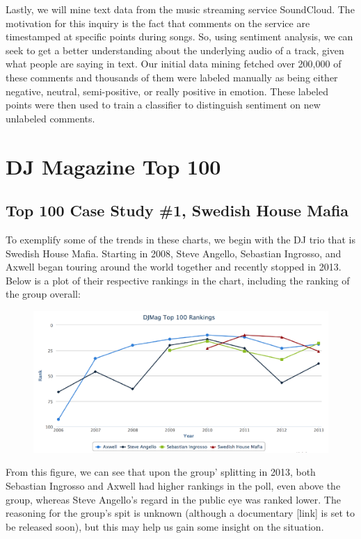 \documentclass[12pt]{dalcsthesis}
\begin{document}
Lastly, we will mine text data from the music streaming service SoundCloud. The motivation for this inquiry is the fact that comments on the service are timestamped at specific points during songs. So, using sentiment analysis, we can seek to get a better understanding about the underlying audio of a track, given what people are saying in text. Our initial data mining fetched over 200,000 of these comments and thousands of them were labeled manually as being either negative, neutral, semi-positive, or really positive in emotion. These labeled points were then used to train a classifier to distinguish sentiment on new unlabeled comments.


\chapter{DJ Magazine Top 100}

\section{Top 100 Case Study \#1, Swedish House Mafia}

To exemplify some of the trends in these charts, we begin with the DJ trio that is Swedish House Mafia. Starting in 2008, Steve Angello, Sebastian Ingrosso, and Axwell began touring around the world together and recently stopped in 2013. Below is a plot of their respective rankings in the chart, including the ranking of the group overall: 

\begin{figure}[h]
\includegraphics[scale=.65]{shm_graph}
\centering
\end{figure}

From this figure, we can see that upon the group' splitting in 2013, both Sebastian Ingrosso and Axwell had higher rankings in the poll, even above the group, whereas Steve Angello's regard in the public eye was ranked lower. The reasoning for the group's spit is unknown (although a documentary [link] is set to be released soon), but this may help us gain some insight on the situation.
\end{document}
